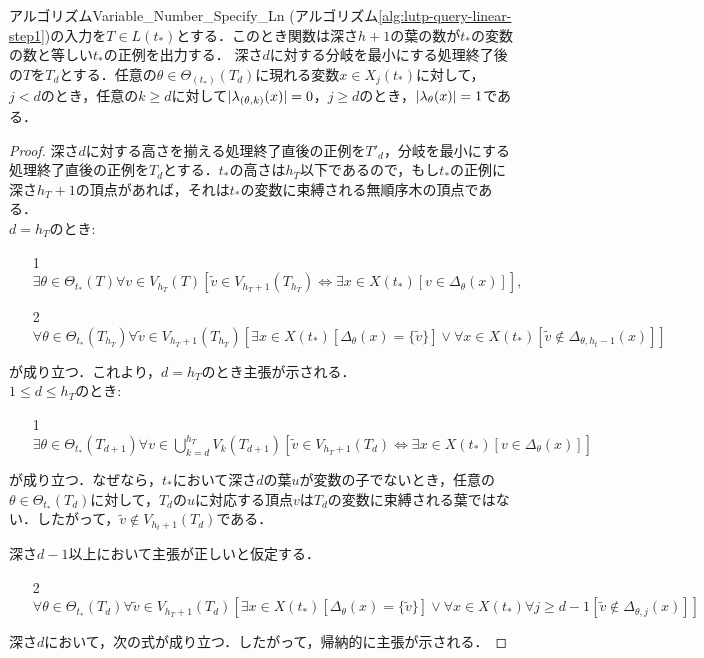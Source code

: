 \begin{lemma}\label{lemma3.1}
  アルゴリズム{\sc Variable\_Number\_Specify\_Ln} (アルゴリズム\ref{alg:lutp-query-linear-step1})の入力を$T\in L(t_{\ast})$とする．このとき関数は深さ$h+1$の葉の数が$t_{\ast}$の変数の数と等しい$t_{\ast}$の正例を出力する．
  深さ$d$に対する分岐を最小にする処理終了後の$T$を$T_d$とする．任意の$\theta\in\Theta_{(t_{\ast})}(T_d)$に現れる変数$x\in X_j(t_{\ast})$に対して，$j<d$のとき，任意の$k\geq d$に対して$\lvert\lambda_{(\theta,k)}(x)\rvert=0$，$j\geq d$のとき，$\lvert\lambda_{\theta}(x)\rvert=1$である．
\end{lemma}

\begin{proof}
  深さ$d$に対する高さを揃える処理終了直後の正例を$T'_d$，分岐を最小にする処理終了直後の正例を$T_d$とする．$t_{\ast}$の高さは$h_T$以下であるので，もし$t_{\ast}$の正例に深さ$h_T+1$の頂点があれば，それは$t_{\ast}$の変数に束縛される無順序木の頂点である．\\

  $d=h_T$のとき:
  \begin{enumerate}
  \item[1] $\exists\theta\in \Theta_{t_{\ast}} (T)\forall v\in V_{h_T}(T)[\tilde{v}\in V_{h_T+1}(T_{h_T})\Leftrightarrow\exists x\in X(t_{\ast})[v\in\Delta_\theta(x)]],$
  \item[2] $\forall\theta\in\Theta_{t_{\ast}}(T_{h_T})\forall\tilde{v}\in V_{h_T+1}(T_{h_T})[\exists x\in X(t_{\ast})[\Delta_\theta(x)=\{\tilde{v}\}]\lor\forall x\in X(t_{\ast})[\tilde{v}\notin\Delta_{\theta,h_t-1}(x)]]$
  \end{enumerate}
  が成り立つ．これより，$d=h_T$のとき主張が示される．\\

  $1\leq d\leq h_T$のとき:
  \begin{enumerate}
    \item[1] $\exists\theta\in\Theta_{t_{\ast}}(T_{d+1})\forall v\in \bigcup_{k=d}^{h_T}V_k(T_{d+1})[\tilde{v}\in V_{h_T+1}(T_d)\Leftrightarrow\exists x\in X(t_{\ast})[v\in\Delta_\theta(x)]]$
  \end{enumerate}
  が成り立つ．なぜなら，$t_{\ast}$において深さ$d$の葉$u$が変数の子でないとき，任意の$\theta\in\Theta_{t_{\ast}}(T_d)$に対して，$T_d$の$u$に対応する頂点$v$は$T_d$の変数に束縛される葉ではない．したがって，$\tilde{v}\notin V_{h_t+1}(T_d)$である．
  
  深さ$d-1$以上において主張が正しいと仮定する．
  \begin{enumerate}
    \item[2] $\forall\theta\in\Theta_{t_{\ast}}(T_d)\forall\tilde{v}\in V_{h_T+1}(T_d)[\exists x \in X(t_{\ast})[\Delta_\theta(x)=\{\tilde{v}\}]\lor\forall x \in X(t_{\ast})\forall j\geq d-1[\tilde{v}\notin\Delta_{\theta,j}(x)]]$
  \end{enumerate}
  深さ$d$において，次の式が成り立つ．したがって，帰納的に主張が示される．
\end{proof}



